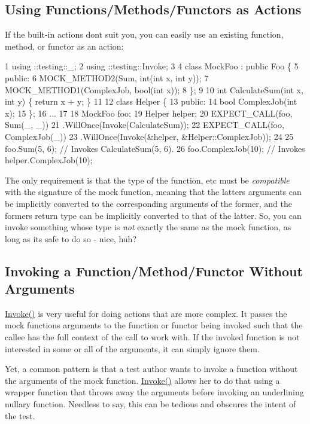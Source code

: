 \subsection*{Using Functions/\+Methods/\+Functors as Actions}

If the built-\/in actions don\textquotesingle{}t suit you, you can easily use an existing function, method, or functor as an action\+:


\begin{DoxyCode}
1 using ::testing::\_;
2 using ::testing::Invoke;
3 
4 class MockFoo : public Foo \{
5  public:
6   MOCK\_METHOD2(Sum, int(int x, int y));
7   MOCK\_METHOD1(ComplexJob, bool(int x));
8 \};
9 
10 int CalculateSum(int x, int y) \{ return x + y; \}
11 
12 class Helper \{
13  public:
14   bool ComplexJob(int x);
15 \};
16 ...
17 
18   MockFoo foo;
19   Helper helper;
20   EXPECT\_CALL(foo, Sum(\_, \_))
21       .WillOnce(Invoke(CalculateSum));
22   EXPECT\_CALL(foo, ComplexJob(\_))
23       .WillOnce(Invoke(&helper, &Helper::ComplexJob));
24 
25   foo.Sum(5, 6);       // Invokes CalculateSum(5, 6).
26   foo.ComplexJob(10);  // Invokes helper.ComplexJob(10);
\end{DoxyCode}


The only requirement is that the type of the function, etc must be {\itshape compatible} with the signature of the mock function, meaning that the latter\textquotesingle{}s arguments can be implicitly converted to the corresponding arguments of the former, and the former\textquotesingle{}s return type can be implicitly converted to that of the latter. So, you can invoke something whose type is {\itshape not} exactly the same as the mock function, as long as it\textquotesingle{}s safe to do so -\/ nice, huh?

\subsection*{Invoking a Function/\+Method/\+Functor Without Arguments}

{\ttfamily \hyperlink{namespacetesting_a12aebaf8363d49a383047529f798b694}{Invoke()}} is very useful for doing actions that are more complex. It passes the mock function\textquotesingle{}s arguments to the function or functor being invoked such that the callee has the full context of the call to work with. If the invoked function is not interested in some or all of the arguments, it can simply ignore them.

Yet, a common pattern is that a test author wants to invoke a function without the arguments of the mock function. {\ttfamily \hyperlink{namespacetesting_a12aebaf8363d49a383047529f798b694}{Invoke()}} allows her to do that using a wrapper function that throws away the arguments before invoking an underlining nullary function. Needless to say, this can be tedious and obscures the intent of the test.

